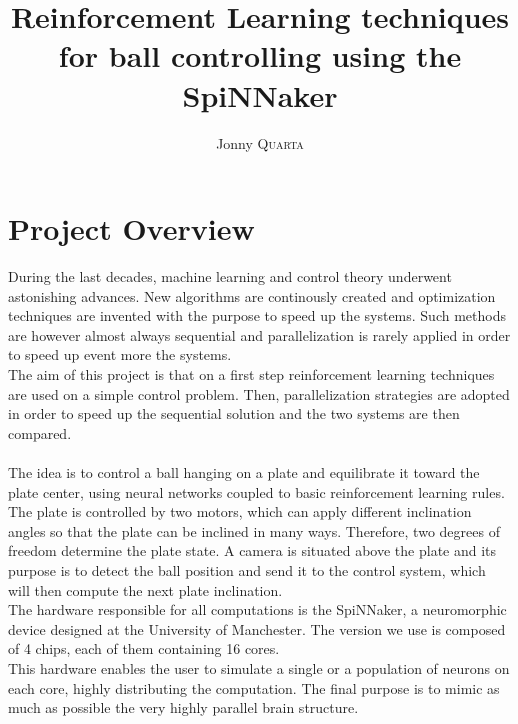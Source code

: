 \documentclass{article}
\title{\textbf{Reinforcement Learning techniques \\ for ball controlling using the SpiNNaker}} %
\author{Jonny \textsc{Quarta}} %
\begin{document}
\maketitle %

\tableofcontents


\section{Project Overview}
During the last decades, machine learning and control theory underwent astonishing advances. New algorithms are continously created and optimization techniques are invented with the purpose to speed up the systems. Such methods are however almost always sequential and parallelization is rarely applied in order to speed up event more the systems. \\

The aim of this project is that on a first step reinforcement learning techniques are used on a simple control problem. Then, parallelization strategies are adopted in order to speed up the sequential solution and the two systems are then compared. \\ \\

The idea is to control a ball hanging on a plate and equilibrate it toward the plate center, using neural networks coupled to basic reinforcement learning rules. The plate is controlled by two motors, which can apply different inclination angles so that the plate can be inclined in many ways. Therefore, two degrees of freedom determine the plate state. A camera is situated above the plate and its purpose is to detect the ball position and send it to the control system, which will then compute the next plate inclination.\\

The hardware responsible for all computations is the SpiNNaker, a neuromorphic device designed at the University of Manchester. The version we use is composed of 4 chips, each of them containing 16 cores.\\
This hardware enables the user to simulate a single or a population of neurons on each core, highly distributing the computation. The final purpose is to mimic as much as possible the very highly parallel brain structure. \\
\end{document}
